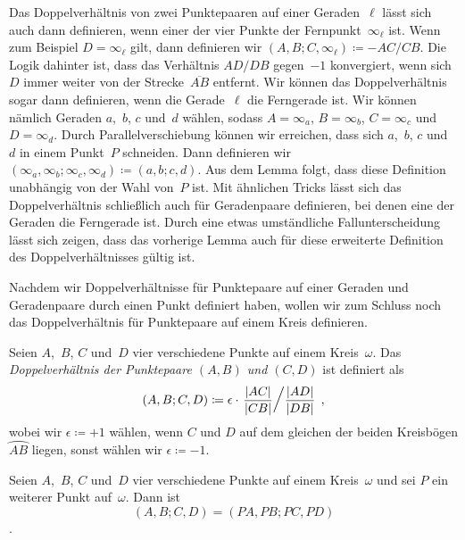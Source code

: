 Das Doppelverhältnis von zwei Punktepaaren auf einer Geraden~$\ell$ lässt sich auch dann definieren, wenn einer der vier Punkte der Fernpunkt~$\infty_\ell$ ist. Wenn zum Beispiel $D=\infty_\ell$ gilt, dann definieren wir $(A,B;C,\infty_\ell)\coloneqq -AC/CB$. Die Logik dahinter ist, dass das Verhältnis $AD/DB$ gegen~$-1$ konvergiert, wenn sich $D$ immer weiter von der Strecke~$\overline{AB}$ entfernt. Wir können das Doppelverhältnis sogar dann definieren, wenn die Gerade~$\ell$ die Ferngerade ist. Wir können nämlich Geraden $a$,~$b$, $c$ und~$d$ wählen, sodass $A=\infty_a$, $B=\infty_b$, $C=\infty_c$ und $D=\infty_d$. Durch Parallelverschiebung können wir erreichen, dass sich $a$,~$b$, $c$ und~$d$ in einem Punkt~$P$ schneiden. Dann definieren wir $(\infty_a,\infty_b;\infty_c,\infty_d)\coloneqq (a,b;c,d)$. Aus dem Lemma folgt, dass diese Definition unabhängig von der Wahl von~$P$ ist. Mit ähnlichen Tricks lässt sich das Doppelverhältnis schließlich auch für Geradenpaare definieren, bei denen eine der Geraden die Ferngerade ist. Durch eine etwas umständliche Fallunterscheidung lässt sich zeigen, dass das vorherige Lemma auch für diese erweiterte Definition des Doppelverhältnisses gültig ist.

Nachdem wir Doppelverhältnisse für Punktepaare auf einer Geraden und Geradenpaare durch einen Punkt definiert haben, wollen wir zum Schluss noch das Doppelverhältnis für Punktepaare auf einem Kreis definieren.

\begin{definition}
	Seien $A$,~$B$, $C$ und~$D$ vier verschiedene Punkte auf einem Kreis~$\omega$. Das \emph{Doppelverhältnis der Punktepaare $(A,B)$ und $(C,D)$} ist definiert als
	\begin{equation*}
		\left(A,B;C,D\right)\coloneqq \epsilon\cdot \left.\frac{\lvert AC\rvert}{\lvert CB\rvert}\middle/\frac{\lvert AD\rvert}{\lvert DB\rvert}\right.\,,
	\end{equation*}
	wobei wir $\epsilon\coloneqq +1$ wählen, wenn $C$ und $D$ auf dem gleichen der beiden Kreisbögen $\wideparen{AB}$ liegen, sonst wählen wir $\epsilon\coloneqq -1$.
\end{definition}

\begin{satzmitnamen}[Lemma]
	Seien $A$,~$B$, $C$ und~$D$ vier verschiedene Punkte auf einem Kreis~$\omega$ und sei $P$ ein weiterer Punkt auf~$\omega$. Dann ist%
	\begin{equation*}
		\left(A,B;C,D\right)=\left(PA,PB;PC,PD\right)
	\end{equation*}
	.
\end{satzmitnamen}

